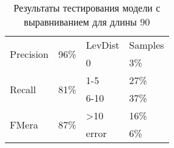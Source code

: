 \begin{table}[h]
\centering
\begin{tabular}{|p{2cm}|p{2cm}||p{2cm}|p{2cm}|}
\hline
\multirow{2}{*}{Precision} & \multirow{2}{*}{96\%} & LevDist & Samples \\ \cline{3-4} 
 &  & 0 & 3\% \\ \hline
\multirow{2}{*}{Recall} & \multirow{2}{*}{81\%} & 1-5 & 27\% \\ \cline{3-4} 
 &  & 6-10 & 37\% \\ \hline
\multirow{2}{*}{FMera} & \multirow{2}{*}{87\%} & \textgreater{}10 & 16\% \\ \cline{3-4} 
 &  & error & 6\% \\ \hline
\end{tabular}
\caption{Результаты тестирования модели с выравниванием для длины 90}
\label{table2}
\end{table}